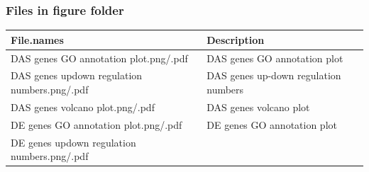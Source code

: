 \documentclass[]{article}
\begin{document}
\subsubsection{Files in figure folder}\label{files-in-figure-folder}

\begin{longtable}[]{@{}ll@{}}
\toprule
\begin{minipage}[b]{0.51\columnwidth}\raggedright\strut
File.names\strut
\end{minipage} & \begin{minipage}[b]{0.43\columnwidth}\raggedright\strut
Description\strut
\end{minipage}\tabularnewline
\midrule
\endhead
\begin{minipage}[t]{0.51\columnwidth}\raggedright\strut
DAS genes GO annotation plot.png/.pdf\strut
\end{minipage} & \begin{minipage}[t]{0.43\columnwidth}\raggedright\strut
DAS genes GO annotation plot\strut
\end{minipage}\tabularnewline
\begin{minipage}[t]{0.51\columnwidth}\raggedright\strut
DAS genes updown regulation numbers.png/.pdf\strut
\end{minipage} & \begin{minipage}[t]{0.43\columnwidth}\raggedright\strut
DAS genes up-down regulation numbers\strut
\end{minipage}\tabularnewline
\begin{minipage}[t]{0.51\columnwidth}\raggedright\strut
DAS genes volcano plot.png/.pdf\strut
\end{minipage} & \begin{minipage}[t]{0.43\columnwidth}\raggedright\strut
DAS genes volcano plot\strut
\end{minipage}\tabularnewline
\begin{minipage}[t]{0.51\columnwidth}\raggedright\strut
DE genes GO annotation plot.png/.pdf\strut
\end{minipage} & \begin{minipage}[t]{0.43\columnwidth}\raggedright\strut
DE genes GO annotation plot\strut
\end{minipage}\tabularnewline
\begin{minipage}[t]{0.51\columnwidth}\raggedright\strut
DE genes updown regulation numbers.png/.pdf\strut
\end{minipage} & \begin{minipage}[t]{0.43\columnwidth}\raggedright\strut

\end{minipage}
\end{longtable}
\end{document}
